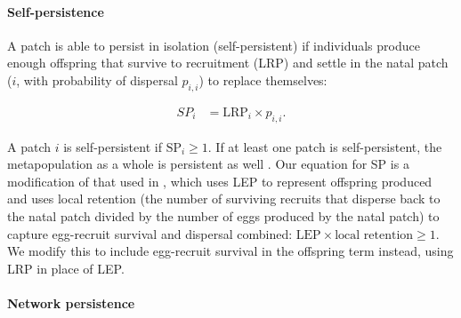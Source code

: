 \documentclass[12pt, oneside]{article}   	%
\begin{document}
\paragraph*{Self-persistence} 

A patch is able to persist in isolation (self-persistent) if individuals produce enough offspring that survive to recruitment (LRP) and settle in the natal patch ($i$, with probability of dispersal $p_{i,i}$) to replace themselves:

\begin{equation}
\begin{split}
SP_i &= \text{LRP}_i \times p_{i,i}. \label{EQN_SP}  %
\end{split}
\end{equation}


A patch $i$ is self-persistent if $\text{SP}_i \geq 1$. If at least one patch is self-persistent, the metapopulation as a whole is persistent as well \citep{hastings_persistence_2006, burgess2014beyond}. Our equation for SP is a modification of that used in \cite{burgess2014beyond}, which uses LEP to represent offspring produced and uses local retention (the number of surviving recruits that disperse back to the natal patch divided by the number of eggs produced by the natal patch) to capture egg-recruit survival and dispersal combined: $\text{LEP} \times \text{local retention} \geq 1$. We modify this to include egg-recruit survival in the offspring term instead, using LRP in place of LEP. %

\paragraph*{Network persistence}
\end{document}
